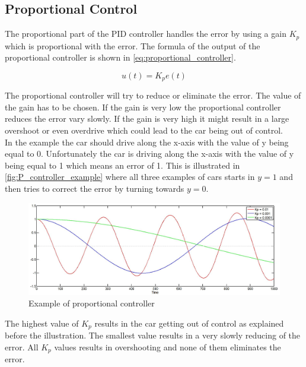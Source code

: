 \subsection{Proportional Control} %
\label{sub:proportional_control}

The proportional part of the PID controller handles the error by using a gain $K_p$ which is proportional with the error. The formula of the output of the proportional controller is shown in \autoref{eq:proportional_controller}.

\begin{equation}
\label{eq:proportional_controller}
u(t)=K_p e(t)
\end{equation}

The proportional controller will try to reduce or eliminate the error. The value of the gain has to be chosen. If the gain is very low the proportional controller reduces the error vary slowly. If the gain is very high it might result in a large overshoot or even overdrive which could lead to the car being out of control. \\

In the example the car should drive along the x-axis with the value of y being equal to 0. Unfortunately the car is driving along the x-axis with the value of y being equal to 1 which means an error of 1. This is illustrated in \autoref{fig:P_controller_example} where all three examples of cars starts in $y=1$ and then tries to correct the error by turning towards $y=0$. \\

\begin{figure}[H]
\centering
\includegraphics[scale=0.35]{images/Pcontroller.jpg}
\caption{Example of proportional controller}
\label{fig:P_controller_example}
\end{figure}

The highest value of $K_p$ results in the car getting out of control as explained before the illustration. The smallest value results in a very slowly reducing of the error. All $K_p$ values results in overshooting and none of them eliminates the error. \\

